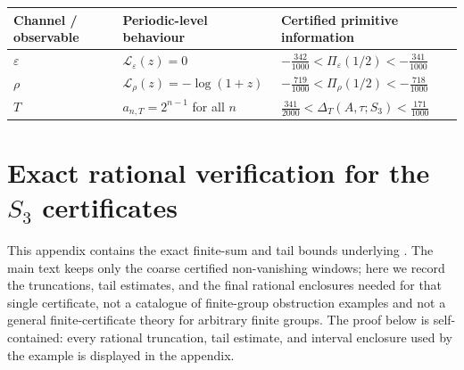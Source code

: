 \documentclass[11pt,a4paper]{amsart}
\theoremstyle{plain}
\theoremstyle{definition}
\theoremstyle{remark}
\begin{document}
\begin{center}
\footnotesize
\begin{tabular}{@{}p{}p{}p{}@{}}
\toprule
Channel / observable & Periodic-level behaviour & Certified primitive information \\
\midrule
\(\varepsilon\) &
\(\mathcal L_\varepsilon(z)=0\) &
\(-\frac{342}{1000}<\Pi_\varepsilon(1/2)<-\frac{341}{1000}\) \\
\(\rho\) &
\(\mathcal L_\rho(z)=-\log(1+z)\) &
\(-\frac{719}{1000}<\Pi_\rho(1/2)<-\frac{718}{1000}\) \\
\(T\) &
\(a_{n,T}=2^{n-1}\) for all \(n\) &
\(\frac{341}{2000}<\Delta_T(A,\tau;S_3)<\frac{171}{1000}\) \\
\bottomrule
\end{tabular}
\end{center}
\section[Exact rational verification for the S3 certificates]{Exact
  rational verification for the \texorpdfstring{$S_3$}{S3}
  certificates}
\label{app:s3-log-certificates}

This appendix contains the exact finite-sum and tail bounds underlying
. The main text keeps only the
coarse certified non-vanishing windows; here we record the truncations,
tail estimates, and the final rational enclosures needed for that single
certificate, not a catalogue of finite-group obstruction examples and not a
general finite-certificate theory for arbitrary finite groups. The proof below
is self-contained: every rational truncation, tail estimate, and interval
enclosure used by the example is displayed in the appendix.
\end{document}
